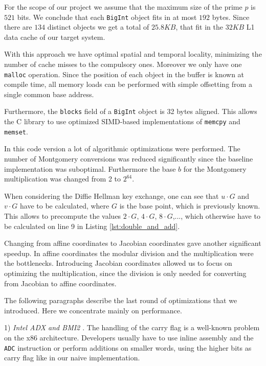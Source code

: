 For the scope of our project we assume that the maximum size of the prime $p$ is $521$ bits. We conclude that each \texttt{BigInt} object fits in at most $192$ bytes. Since there are $134$ distinct objects we get a total of $25.8KB$, that fit in the $32KB$ L1 data cache of our target system.

With this approach we have optimal spatial and temporal locality, minimizing the number of cache misses to the compulsory ones. Moreover we only have one \texttt{malloc} operation. Since the position of each object in the buffer is known at compile time, all memory loads can be performed with simple offsetting from a single common base address.


Furthermore, the \texttt{blocks} field of a \texttt{BigInt} object is 32 bytes aligned. This allows the C library to use optimized SIMD-based implementations of \texttt{memcpy} and \texttt{memset}.

In this code version a lot of algorithmic optimizations were performed. The number of Montgomery conversions was reduced significantly since the baseline implementation was suboptimal. Furthermore the base $b$ for the Montgomery multiplication was changed from 2 to $2^{64}$.

When considering the Diffie Hellman key exchange, one can see that $u \cdot G$ and $v \cdot G$ have to be calculated, where $G$ is the base point, which is previously known. This allows to precompute the values $2 \cdot G$, $4 \cdot G$, $8 \cdot G$,..., which otherwise have to be calculated on line 9 in Listing \ref{lst:double_and_add}.

Changing from affine coordinates to Jacobian coordinates gave another significant speedup. In affine coordinates the modular division and the multiplication were the bottlenecks. Introducing Jacobian coordinates allowed us to focus on optimizing the multiplication, since the division is only needed for converting from Jacobian to affine coordinates.

The following paragraphs describe the last round of optimizations that we introduced. Here we concentrate mainly on performance. 

1) \emph{Intel ADX and BMI2 \cite{Otzturk:2012}}. 
The handling of the carry flag is a well-known problem on the x86 architecture. Developers usually have to use inline assembly and the \texttt{ADC} instruction or perform additions on smaller words, using the higher bits as carry flag like in our naive implementation.

